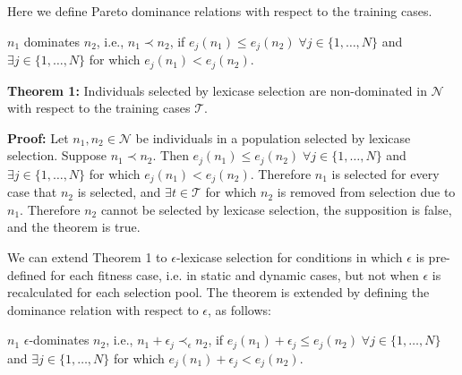 \documentclass[preprint]{article}
\begin{document}
Here we define Pareto dominance relations with respect to the training cases. 

\medskip
{} $n_1$ dominates $n_2$, i.e., ${n_1} \prec {n_2}$, if $e_j(n_1) \leq e_j(n_2) \;
\forall j  \in \{1,\dots,N\}$ and $\exists j \in \{1,\dots,N\}$ for which $e_j(n_1) < e_j(n_2)$. \bigskip
\bigskip

\medskip
\noindent \textbf{Theorem 1:} Individuals selected by lexicase selection are non-dominated in $\mathcal{N}$ with respect to the training cases $\mathcal{T}$. 
\medskip

\noindent \textbf{Proof:} Let $n_1, n_2 \in \mathcal{N}$ be individuals in a population selected by lexicase selection. Suppose $n_1 \prec n_2$. Then $e_j(n_1) \leq e_j(n_2) \;
\forall j  \in \{1,\dots,N\}$ and $\exists j \in \{1,\dots,N\}$ for which $e_j(n_1) < e_j(n_2)$. Therefore $n_1$ is selected for every case that $n_2$ is selected, and $\exists t \in \mathcal{T}$ for which $n_2$ is removed from selection due to $n_1$. Therefore $n_2$ cannot be selected by lexicase selection, the supposition is false, and the theorem is true. 
\bigskip


We can extend Theorem 1 to $\epsilon$-lexicase selection for conditions in which $\epsilon$ is pre-defined for each fitness case, i.e. in static and dynamic cases, but not when $\epsilon$ is recalculated for each selection pool. The theorem is extended by defining the dominance relation with respect to $\epsilon$, as follows:


\medskip
{} $n_1$ $\epsilon$-dominates $n_2$, i.e., ${n_1} + \epsilon_j \prec_{\epsilon} {n_2}$, if $e_j(n_1) + \epsilon_j \leq e_j(n_2)  \;
\forall j  \in \{1,\dots,N\}$ and $\exists j \in \{1,\dots,N\}$ for which $e_j(n_1) + \epsilon_j < e_j(n_2) $. \bigskip
\bigskip
\end{document}
